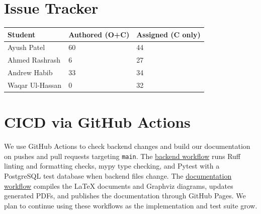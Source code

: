\documentclass{article}
\begin{document}

\section{Issue Tracker}


\begin{table}[H]
\centering
\begin{tabular}{lll}
\toprule
\textbf{Student} & \textbf{Authored (O+C)} & \textbf{Assigned (C only)}\\
\midrule
Ayush Patel & 60 & 44 \\
Ahmed Rashrash & 6 & 27 \\
Andrew Habib & 33 & 34 \\
Waqar Ul-Hassan & 0 & 32 \\
\bottomrule
\end{tabular}
\end{table}


\section{CICD via GitHub Actions}

We use GitHub Actions to check backend changes and build our documentation on pushes and pull requests targeting \texttt{main}. The \href{https://github.com/Ayushpatel2026/Keystone/blob/main/.github/workflows/backend-ci.yml}{backend workflow} runs Ruff linting and formatting checks, mypy type checking, and Pytest with a PostgreSQL test database when backend files change. The \href{https://github.com/Ayushpatel2026/Keystone/blob/main/.github/workflows/latex-pages.yml}{documentation workflow} compiles the LaTeX documents and Graphviz diagrams, updates generated PDFs, and publishes the documentation through GitHub Pages. We plan to continue using these workflows as the implementation and test suite grow.

\end{document}
